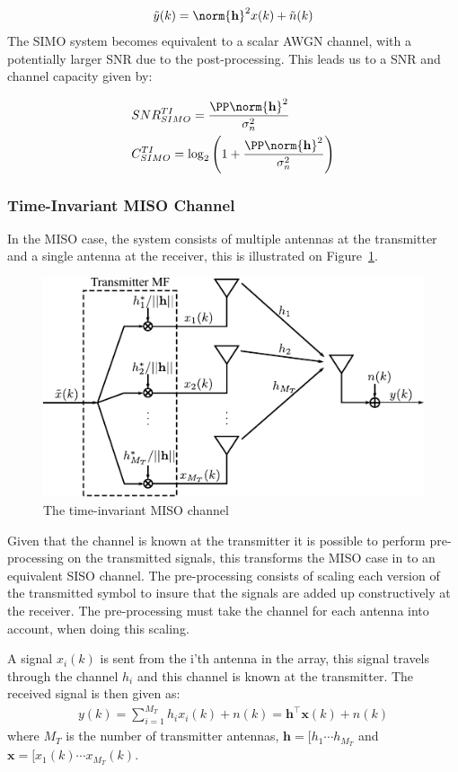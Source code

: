 \begin{align*}
  \tilde{y}(k) = \norm{\mathbf{h}}^2 x(k) + \tilde{n}(k)
\end{align*}
The SIMO system becomes equivalent to a scalar AWGN channel, with a potentially larger SNR due to the post-processing. This leads us to a SNR and channel capacity given by: 

\begin{align*}
&SNR^{TI}_{SIMO} = \frac{\PP \norm{\mathbf{h}}^2}{\sigma^2_n} \\
&C^{TI}_{SIMO} = \log_2 \left( 1+\frac{\PP \norm{\mathbf{h}}^2}{\sigma^2_n} \right)  
\end{align*}

\subsubsection{Time-Invariant MISO Channel}
In the MISO case, the system consists of multiple antennas at the transmitter and a single antenna at the receiver, this is illustrated on Figure~\ref{fig:misoModel}.
\begin{figure}[htbp]
  \centering
  \includegraphics[scale=1.2]{img/analysis/misoModel}
  \caption{The time-invariant MISO channel}
  \label{fig:misoModel}
\end{figure}
Given that the channel is known at the transmitter it is possible to perform pre-processing on the transmitted signals, this transforms the MISO case in to an equivalent SISO channel. The pre-processing consists of scaling each version of the transmitted symbol to insure that the signals are added up constructively at the receiver. The pre-processing must take the channel for each antenna into account, when doing this scaling. 

A signal $x_i(k)$ is sent from the i'th antenna in the array, this signal travels through the channel $h_i$ and this channel is known at the transmitter. The received signal is then given as: 
\begin{align*}
  y(k) = \sum_{i=1}^{M_T} h_ix_i(k) + n(k) = \mathbf{h}^\intercal \mathbf{x}(k) + n(k)
\end{align*}
where $M_T$ is the number of transmitter antennas, $\mathbf{h} = [h_1 \cdots h_{M_T}$ and $\mathbf{x} = [x_1(k) \cdots x_{M_T}(k)$. 



